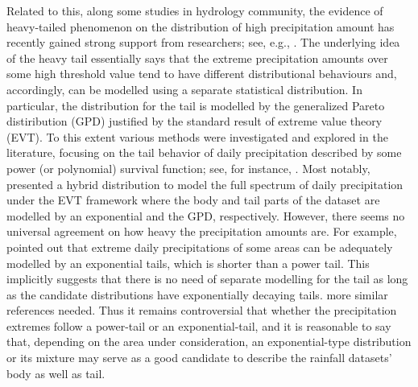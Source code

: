 \documentclass[12pt]{article}\usepackage[]{graphicx}\usepackage[]{color}
\newcommand{\cred}{ \color{red}}
\begin{document}
Related to this, along some studies in hydrology community, the evidence of heavy-tailed phenomenon on the distribution of high precipitation amount has recently gained strong support from researchers; see, e.g.,  \cite{koutsoyiannis2004statistics}. The underlying idea of the heavy tail essentially says that the extreme precipitation amounts over some high threshold value tend to have different distributional behaviours and, accordingly, can be modelled using a separate statistical distribution. In particular, the distribution for the tail is modelled by the generalized Pareto distiribution (GPD) justified by the standard result of extreme value theory (EVT). To this extent various methods were investigated and explored in the literature, focusing on the tail behavior of daily precipitation described by some power (or polynomial) survival function; see, for instance, \cite{furrer2008improving, li2012simulation, papalexiou2012entropy, papalexiou2013extreme}. Most notably, \cite{li2012simulation} presented a hybrid distribution to model the full spectrum of daily precipitation under the EVT framework where the body and tail parts of the dataset are modelled by an exponential and the GPD, respectively. However, there seems no universal agreement on how heavy the precipitation amounts are. For example, \cite{wilson2005fundamental} pointed out that extreme daily precipitations of some areas can be adequately modelled by an exponential tails, which is shorter than a power tail. This implicitly suggests that there is no need of separate modelling for the tail as long as the candidate distributions have exponentially decaying tails. {\cred more similar references needed.} Thus it remains controversial that whether the precipitation extremes follow a power-tail or an exponential-tail, and it is reasonable to say that, depending on the area under consideration, an exponential-type distribution or its mixture may serve as a good candidate to describe the rainfall datasets' body as well as tail. \\
\end{document}
